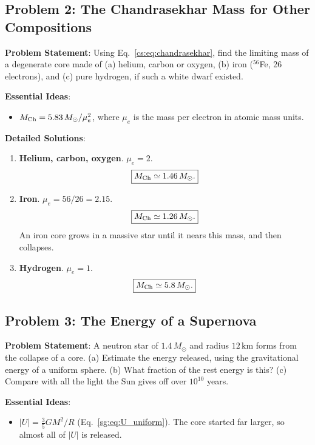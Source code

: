 \subsection{Problem 2: The Chandrasekhar Mass for Other Compositions}
\label{cs:prob:mch}

\textbf{Problem Statement}: Using Eq.~\eqref{cs:eq:chandrasekhar}, find the limiting mass of a degenerate core made of (a) helium, carbon or oxygen, (b) iron ($^{56}$Fe, 26 electrons), and (c) pure hydrogen, if such a white dwarf existed.

\textbf{Essential Ideas}:
\begin{itemize}
	\item $M_{\rm Ch}=5.83\,M_\odot/\mu_e^2$, where $\mu_e$ is the mass per electron in atomic mass units.
\end{itemize}

\textbf{Detailed Solutions}:
\begin{enumerate}[label=(\alph*)]
	\item \textbf{Helium, carbon, oxygen}. $\mu_e=2$.
	\[
	\boxed{M_{\rm Ch}\simeq1.46\,M_\odot.}
	\]
	\item \textbf{Iron}. $\mu_e=56/26=2.15$.
	\[
	\boxed{M_{\rm Ch}\simeq1.26\,M_\odot.}
	\]
	An iron core grows in a massive star until it nears this mass, and then collapses.
	\item \textbf{Hydrogen}. $\mu_e=1$.
	\[
	\boxed{M_{\rm Ch}\simeq5.8\,M_\odot.}
	\]
\end{enumerate}

\subsection{Problem 3: The Energy of a Supernova}
\label{cs:prob:binding}

\textbf{Problem Statement}: A neutron star of $1.4\,M_\odot$ and radius $12\,\mathrm{km}$ forms from the collapse of a core. (a) Estimate the energy released, using the gravitational energy of a uniform sphere. (b) What fraction of the rest energy is this? (c) Compare with all the light the Sun gives off over $10^{10}$ years.

\textbf{Essential Ideas}:
\begin{itemize}
	\item $|U|=\tfrac35GM^2/R$ (Eq.~\eqref{sg:eq:U_uniform}). The core started far larger, so almost all of $|U|$ is released.
\end{itemize}

